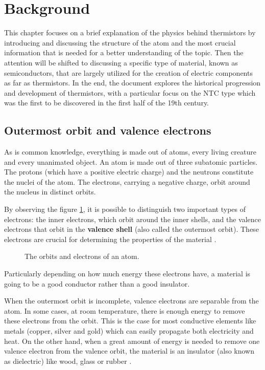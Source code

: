 \vspace{30px}\section{Background}
This chapter focuses on a brief explanation of the physics behind thermistors by introducing and discussing the structure of the atom and the most crucial information that is needed for a better understanding of the topic. Then the attention will be shifted to discussing a specific type of material, known as semiconductors, that are largely utilized for the creation of electric components as far as thermistors. In the end, the document explores the historical progression and development of thermistors, with a particular focus on the NTC type which was the first to be discovered in the first half of the 19th century.


\subsection{Outermost orbit and valence electrons}
As is common knowledge, everything is made out of atoms, every living creature and every unanimated object. An atom is made out of three subatomic particles. The protons (which have a positive electric charge) and the neutrons constitute the nuclei of the atom. The electrons, carrying a negative charge, orbit around the nucleus in distinct orbits.

By observing the figure \ref{fig:atom-structure}, it is possible to distinguish two important types of electrons: the inner electrons, which orbit around the inner shells, and the valence electrons that orbit in the \textbf{valence shell} (also called the outermost orbit). These electrons are crucial for determining the properties of the material \cite{Gupta20163}.
\begin{figure}[h]
    \centering
    
    \caption{The orbits and electrons of an atom.}
    \label{fig:atom-structure}
\end{figure}
Particularly depending on how much energy these electrons have, a material is going to be a good conductor rather than a good insulator.

When the outermost orbit is incomplete, valence electrons are separable from the atom. In some cases, at room temperature, there is enough energy to remove these electrons from the orbit. This is the case for most conductive elements like metals (copper, silver and gold) which can easily propagate both electricity and heat. On the other hand, when a great amount of energy is needed to remove one valence electron from the valence orbit, the material is an insulator (also known as dielectric) like wood, glass or rubber \cite{Gupta20163}. 

